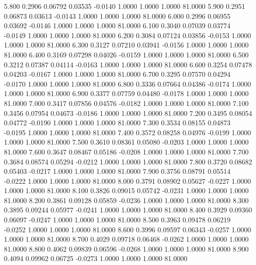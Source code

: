    5.800   0.2906   0.06792   0.03535  -0.0140   1.0000   1.0000   1.0000  81.0000
   5.900   0.2951   0.06873   0.03613  -0.0143   1.0000   1.0000   1.0000  81.0000
   6.000   0.2996   0.06955   0.03692  -0.0146   1.0000   1.0000   1.0000  81.0000
   6.100   0.3040   0.07039   0.03774  -0.0149   1.0000   1.0000   1.0000  81.0000
   6.200   0.3084   0.07124   0.03856  -0.0153   1.0000   1.0000   1.0000  81.0000
   6.300   0.3127   0.07210   0.03941  -0.0156   1.0000   1.0000   1.0000  81.0000
   6.400   0.3169   0.07298   0.04026  -0.0159   1.0000   1.0000   1.0000  81.0000
   6.500   0.3212   0.07387   0.04114  -0.0163   1.0000   1.0000   1.0000  81.0000
   6.600   0.3254   0.07478   0.04203  -0.0167   1.0000   1.0000   1.0000  81.0000
   6.700   0.3295   0.07570   0.04294  -0.0170   1.0000   1.0000   1.0000  81.0000
   6.800   0.3336   0.07664   0.04386  -0.0174   1.0000   1.0000   1.0000  81.0000
   6.900   0.3377   0.07759   0.04480  -0.0178   1.0000   1.0000   1.0000  81.0000
   7.000   0.3417   0.07856   0.04576  -0.0182   1.0000   1.0000   1.0000  81.0000
   7.100   0.3456   0.07954   0.04673  -0.0186   1.0000   1.0000   1.0000  81.0000
   7.200   0.3495   0.08054   0.04772  -0.0190   1.0000   1.0000   1.0000  81.0000
   7.300   0.3534   0.08155   0.04873  -0.0195   1.0000   1.0000   1.0000  81.0000
   7.400   0.3572   0.08258   0.04976  -0.0199   1.0000   1.0000   1.0000  81.0000
   7.500   0.3610   0.08361   0.05080  -0.0203   1.0000   1.0000   1.0000  81.0000
   7.600   0.3647   0.08467   0.05186  -0.0208   1.0000   1.0000   1.0000  81.0000
   7.700   0.3684   0.08574   0.05294  -0.0212   1.0000   1.0000   1.0000  81.0000
   7.800   0.3720   0.08682   0.05403  -0.0217   1.0000   1.0000   1.0000  81.0000
   7.900   0.3756   0.08791   0.05514  -0.0222   1.0000   1.0000   1.0000  81.0000
   8.000   0.3791   0.08902   0.05627  -0.0227   1.0000   1.0000   1.0000  81.0000
   8.100   0.3826   0.09015   0.05742  -0.0231   1.0000   1.0000   1.0000  81.0000
   8.200   0.3861   0.09128   0.05859  -0.0236   1.0000   1.0000   1.0000  81.0000
   8.300   0.3895   0.09244   0.05977  -0.0241   1.0000   1.0000   1.0000  81.0000
   8.400   0.3929   0.09360   0.06097  -0.0247   1.0000   1.0000   1.0000  81.0000
   8.500   0.3963   0.09478   0.06219  -0.0252   1.0000   1.0000   1.0000  81.0000
   8.600   0.3996   0.09597   0.06343  -0.0257   1.0000   1.0000   1.0000  81.0000
   8.700   0.4029   0.09718   0.06468  -0.0262   1.0000   1.0000   1.0000  81.0000
   8.800   0.4062   0.09839   0.06596  -0.0268   1.0000   1.0000   1.0000  81.0000
   8.900   0.4094   0.09962   0.06725  -0.0273   1.0000   1.0000   1.0000  81.0000
